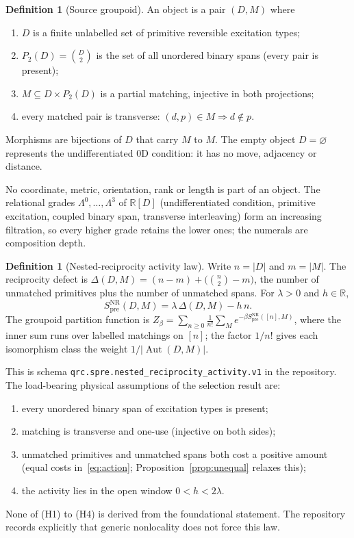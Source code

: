 \documentclass[11pt]{article}
\theoremstyle{definition}
\newtheorem{definition}[theorem]{Definition}
\theoremstyle{remark}
\newcommand{\Spre}{S^{\mathrm{NR}}_{\mathrm{pre}}}
\newcommand{\R}{\mathbb{R}}
\newcommand{\Aut}{\operatorname{Aut}}
\begin{document}
\begin{definition}[Source groupoid]
\label{def:groupoid}
An object is a pair $(D,M)$ where
\begin{enumerate}
\item $D$ is a finite unlabelled set of primitive reversible excitation types;
\item $P_2(D)=\binom{D}{2}$ is the set of all unordered binary spans (every pair is present);
\item $M\subseteq D\times P_2(D)$ is a partial matching, injective in both projections;
\item every matched pair is transverse: $(d,p)\in M \Rightarrow d\notin p$.
\end{enumerate}
Morphisms are bijections of $D$ that carry $M$ to $M$. The empty object $D=\varnothing$
represents the undifferentiated 0D condition: it has no move, adjacency or distance.
\end{definition}

No coordinate, metric, orientation, rank or length is part of an object. The relational
grades $\Lambda^0,\dots,\Lambda^3$ of $\R[D]$ (undifferentiated condition, primitive
excitation, coupled binary span, transverse interleaving) form an increasing filtration,
so every higher grade retains the lower ones; the numerals are composition depth.

\begin{definition}[Nested-reciprocity activity law]
\label{def:action}
Write $n=|D|$ and $m=|M|$. The reciprocity defect is
$\Delta(D,M)=(n-m)+\bigl(\binom n2-m\bigr)$, the number of unmatched primitives plus the
number of unmatched spans. For $\lambda>0$ and $h\in\R$,
\begin{equation}
\Spre(D,M)=\lambda\,\Delta(D,M)-h\,n .
\label{eq:action}
\end{equation}
The groupoid partition function is
$Z_\beta=\sum_{n\ge0}\frac{1}{n!}\sum_{M}e^{-\beta \Spre([n],M)}$, where the inner sum runs
over labelled matchings on $[n]$; the factor $1/n!$ gives each isomorphism class the
weight $1/|\Aut(D,M)|$.
\end{definition}

This is schema \texttt{qrc.spre.nested\_reciprocity\_activity.v1} in the repository. The
load-bearing physical assumptions of the selection result are:
\begin{enumerate}
\item[(H1)] every unordered binary span of excitation types is present;
\item[(H2)] matching is transverse and one-use (injective on both sides);
\item[(H3)] unmatched primitives and unmatched spans both cost a positive amount (equal
  costs in~\eqref{eq:action}; Proposition~\ref{prop:unequal} relaxes this);
\item[(H4)] the activity lies in the open window $0<h<2\lambda$.
\end{enumerate}
None of (H1) to (H4) is derived from the foundational statement. The repository records
explicitly that generic nonlocality does not force this law.
\end{document}
